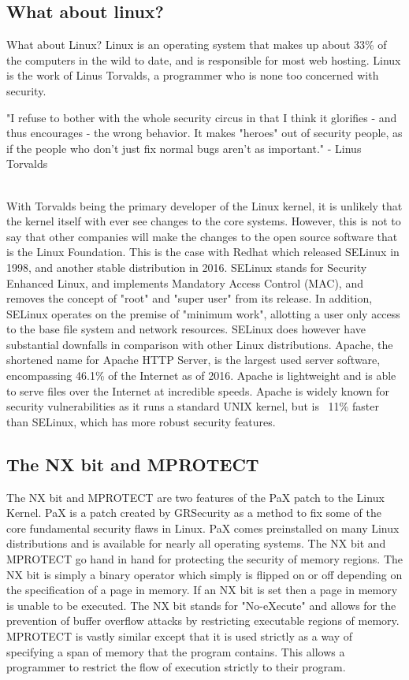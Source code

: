\documentclass{article}
\newcommand\tab[1][1cm]{\hspace*{#1}}
\begin{document}
\subsection{What about linux?}
\tab What about Linux? Linux is an operating system that makes up about 33\% of the computers in the wild to date, and is responsible for most web hosting. Linux is the work of Linus Torvalds, a programmer who is none too concerned with security. 
\\
\begin{center}
"I refuse to bother with the whole security circus in that I think it glorifies - and thus encourages - the wrong behavior. It makes "heroes" out of security people, as if the people who don't just fix normal bugs aren't as important." - Linus Torvalds
\end{center}
\\
\tab With Torvalds being the primary developer of the Linux kernel, it is unlikely that the kernel itself with ever see changes to the core systems. However, this is not to say that other companies will make the changes to the open source software that is the Linux Foundation. This is the case with Redhat which released SELinux in 1998, and another stable distribution in 2016. SELinux stands for Security Enhanced Linux, and implements Mandatory Access Control (MAC), and removes the concept of "root" and "super user" from its release. In addition, SELinux operates on the premise of "minimum work", allotting a user only access to the base file system and network resources. SELinux does however have substantial downfalls in comparison with other Linux distributions. Apache, the shortened name for Apache HTTP Server, is the largest used server software, encompassing 46.1\% of the Internet as of 2016. Apache is lightweight and is able to serve files over the Internet at incredible speeds. Apache is widely known for security vulnerabilities as it runs a standard UNIX kernel, but is ~11\% faster than SELinux, which has more robust security features.
\\
\subsection{The NX bit and MPROTECT}
\tab The NX bit and MPROTECT are two features of the PaX patch to the Linux Kernel. PaX is a patch created by GRSecurity as a method to fix some of the core fundamental security flaws in Linux. PaX comes preinstalled on many Linux distributions and is available for nearly all operating systems. The NX bit and MPROTECT go hand in hand for protecting the security of memory regions. The NX bit is simply a binary operator which simply is flipped on or off depending on the specification of a page in memory. If an NX bit is set then a page in memory is unable to be executed. The NX bit stands for "No-eXecute" and allows for the prevention of buffer overflow attacks by restricting executable regions of memory. MPROTECT is vastly similar except that it is used strictly as a way of specifying a span of memory that the program contains. This allows a programmer to restrict the flow of execution strictly to their program.
\\
\end{document}
